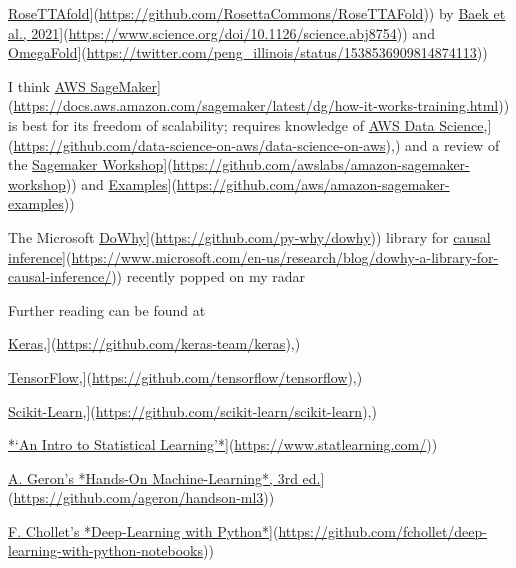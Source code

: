 \documentclass[
]{book}
\begin{document}
\href{\%5Bhttps://github.com/RosettaCommons/RoseTTAFold}{RoseTTAfold}{]}(\url{https://github.com/RosettaCommons/RoseTTAFold})) by \href{\%5Bhttps://www.science.org/doi/10.1126/science.abj8754}{Baek et al., 2021}{]}(\url{https://www.science.org/doi/10.1126/science.abj8754})) and \href{\%5Bhttps://twitter.com/peng_illinois/status/1538536909814874113}{OmegaFold}{]}(\url{https://twitter.com/peng_illinois/status/1538536909814874113}))

I think \href{\%5Bhttps://docs.aws.amazon.com/sagemaker/latest/dg/how-it-works-training.html}{AWS SageMaker}{]}(\url{https://docs.aws.amazon.com/sagemaker/latest/dg/how-it-works-training.html})) is best for its freedom of scalability; requires knowledge of \href{\%5Bhttps://github.com/data-science-on-aws/data-science-on-aws}{AWS Data Science},{]}(\url{https://github.com/data-science-on-aws/data-science-on-aws}),) and a review of the \href{\%5Bhttps://github.com/awslabs/amazon-sagemaker-workshop}{Sagemaker Workshop}{]}(\url{https://github.com/awslabs/amazon-sagemaker-workshop})) and \href{\%5Bhttps://github.com/aws/amazon-sagemaker-examples}{Examples}{]}(\url{https://github.com/aws/amazon-sagemaker-examples}))

The Microsoft \href{\%5Bhttps://github.com/py-why/dowhy}{DoWhy}{]}(\url{https://github.com/py-why/dowhy})) library for \href{\%5Bhttps://www.microsoft.com/en-us/research/blog/dowhy-a-library-for-causal-inference/}{causal inference}{]}(\url{https://www.microsoft.com/en-us/research/blog/dowhy-a-library-for-causal-inference/})) recently popped on my radar

Further reading can be found at

\href{\%5Bhttps://github.com/keras-team/keras}{Keras},{]}(\url{https://github.com/keras-team/keras}),)

\href{\%5Bhttps://github.com/tensorflow/tensorflow}{TensorFlow},{]}(\url{https://github.com/tensorflow/tensorflow}),)

\href{\%5Bhttps://github.com/scikit-learn/scikit-learn}{Scikit-Learn},{]}(\url{https://github.com/scikit-learn/scikit-learn}),)

\href{\%5Bhttps://www.statlearning.com/}{*`An Intro to Statistical Learning'*}{]}(\url{https://www.statlearning.com/}))

\href{\%5Bhttps://github.com/ageron/handson-ml3}{A. Geron's *Hands-On Machine-Learning*, 3rd ed.}{]}(\url{https://github.com/ageron/handson-ml3}))

\href{\%5Bhttps://github.com/fchollet/deep-learning-with-python-notebooks}{F. Chollet's *Deep-Learning with Python*}{]}(\url{https://github.com/fchollet/deep-learning-with-python-notebooks}))
\end{document}
